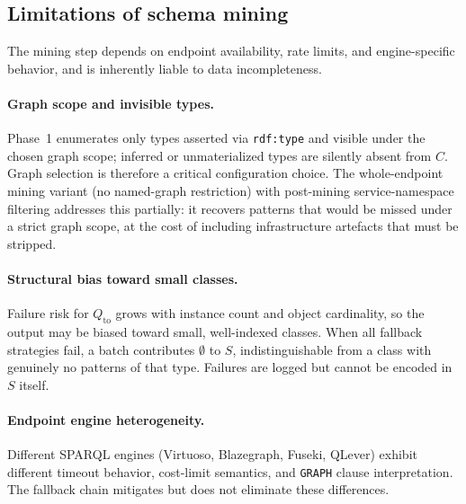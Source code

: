 \documentclass[12pt]{article}
\begin{document}
\subsection{Limitations of schema mining}
\label{sec:mining-discussion}

The mining step depends on endpoint availability, rate limits, and
engine-specific behavior, and is inherently liable to data
incompleteness.

\paragraph*{Graph scope and invisible types.}
Phase~1 enumerates only types asserted via \texttt{rdf:type} and
visible under the chosen graph scope; inferred or unmaterialized
types are silently absent from $C$.
Graph selection is therefore a critical configuration choice.
The whole-endpoint mining variant (no named-graph restriction) with
post-mining service-namespace filtering addresses this partially:
it recovers patterns that would be missed under a strict graph scope,
at the cost of including infrastructure artefacts that must be
stripped.

\paragraph*{Structural bias toward small classes.}
Failure risk for $Q_\mathrm{to}$ grows with instance count and object
cardinality, so the output may be biased toward small, well-indexed
classes.
When all fallback strategies fail, a batch contributes $\emptyset$ to
$S$, indistinguishable from a class with genuinely no patterns of
that type.
Failures are logged but cannot be encoded in $S$ itself.

\paragraph*{Endpoint engine heterogeneity.}
Different SPARQL engines (Virtuoso, Blazegraph, Fuseki, QLever)
exhibit different timeout behavior, cost-limit semantics, and
\texttt{GRAPH} clause interpretation.
The fallback chain mitigates but does not eliminate these differences.
\end{document}
